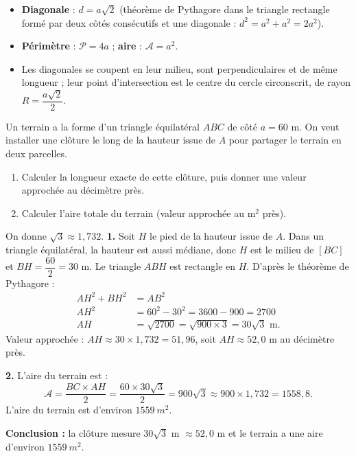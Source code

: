 \documentclass[11pt]{article}
\begin{document}
\begin{propriete}
\begin{itemize}
\item \textbf{Diagonale} : $d = a\sqrt{2}$ (théorème de Pythagore dans le triangle rectangle formé par deux côtés consécutifs et une diagonale : $d^2 = a^2 + a^2 = 2a^2$).
\item \textbf{Périmètre} : $\mathcal{P} = 4a$ ; \textbf{aire} : $\mathcal{A} = a^2$.
\item Les diagonales se coupent en leur milieu, sont perpendiculaires et de même longueur ; leur point d'intersection est le centre du cercle circonscrit, de rayon $R = \dfrac{a\sqrt{2}}{2}$.
\end{itemize}
\end{propriete}

\begin{exoresolu}
Un terrain a la forme d'un triangle équilatéral $ABC$ de côté $a = 60$ m. On veut installer une clôture le long de la hauteur issue de $A$ pour partager le terrain en deux parcelles.
\begin{enumerate}
\item Calculer la longueur exacte de cette clôture, puis donner une valeur approchée au décimètre près.
\item Calculer l'aire totale du terrain (valeur approchée au m$^2$ près).
\end{enumerate}
On donne $\sqrt{3} \approx 1{,}732$.
\tcblower
\textbf{1.} Soit $H$ le pied de la hauteur issue de $A$. Dans un triangle équilatéral, la hauteur est aussi médiane, donc $H$ est le milieu de $[BC]$ et $BH = \dfrac{60}{2} = 30$ m.
Le triangle $ABH$ est rectangle en $H$. D'après le théorème de Pythagore :
\begin{align*}
AH^2 + BH^2 &= AB^2 \\
AH^2 &= 60^2 - 30^2 = 3600 - 900 = 2700 \\
AH &= \sqrt{2700} = \sqrt{900 \times 3} = 30\sqrt{3} \text{ m}.
\end{align*}
Valeur approchée : $AH \approx 30 \times 1{,}732 = 51{,}96$, soit $AH \approx 52{,}0$ m au décimètre près.

\textbf{2.} L'aire du terrain est :
\[ \mathcal{A} = \frac{BC \times AH}{2} = \frac{60 \times 30\sqrt{3}}{2} = 900\sqrt{3} \approx 900 \times 1{,}732 = 1558{,}8. \]
L'aire du terrain est d'environ $\SI{1559}{m^2}$.

\textbf{Conclusion :} la clôture mesure $30\sqrt{3}$ m $\approx 52{,}0$ m et le terrain a une aire d'environ $\SI{1559}{m^2}$.
\end{exoresolu}
\end{document}
